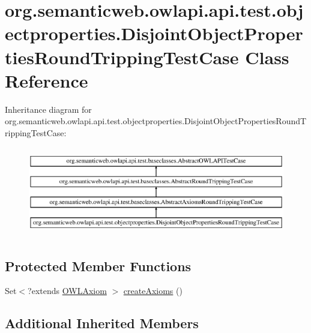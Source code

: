 \hypertarget{classorg_1_1semanticweb_1_1owlapi_1_1api_1_1test_1_1objectproperties_1_1_disjoint_object_properties_round_tripping_test_case}{\section{org.\-semanticweb.\-owlapi.\-api.\-test.\-objectproperties.\-Disjoint\-Object\-Properties\-Round\-Tripping\-Test\-Case Class Reference}
\label{classorg_1_1semanticweb_1_1owlapi_1_1api_1_1test_1_1objectproperties_1_1_disjoint_object_properties_round_tripping_test_case}
}
Inheritance diagram for org.\-semanticweb.\-owlapi.\-api.\-test.\-objectproperties.\-Disjoint\-Object\-Properties\-Round\-Tripping\-Test\-Case\-:\begin{figure}[H]
\begin{center}
\leavevmode
\includegraphics[height=3.943662cm]{classorg_1_1semanticweb_1_1owlapi_1_1api_1_1test_1_1objectproperties_1_1_disjoint_object_properties_round_tripping_test_case}
\end{center}
\end{figure}
\subsection*{Protected Member Functions}
\begin{DoxyCompactItemize}
\item 
Set$<$?extends \hyperlink{interfaceorg_1_1semanticweb_1_1owlapi_1_1model_1_1_o_w_l_axiom}{O\-W\-L\-Axiom} $>$ \hyperlink{classorg_1_1semanticweb_1_1owlapi_1_1api_1_1test_1_1objectproperties_1_1_disjoint_object_properties_round_tripping_test_case_af5305e018eb43e4d9130b8a8d8699b89}{create\-Axioms} ()
\end{DoxyCompactItemize}
\subsection*{Additional Inherited Members}


